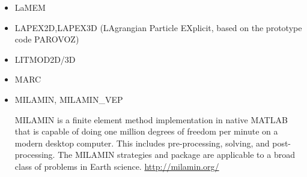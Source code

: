 \begin{itemize}
{\small
\noindent
\cite{facc14}
}

\item LaMEM 

{\small
\noindent
\cite{scbe08}
\cite{kamm10}
\cite{lemk11}
\cite{may12}
\cite{lesh14}\cite{cokm14}\cite{bakp14}\cite{feka14a}\cite{feka14b}
\cite{puka15}\cite{feka15}\cite{cofk15}
\cite{kapb16}\cite{coyc16}
\cite{pukp18}
\cite{eitp19}\cite{eitf20}
}

\item LAPEX2D,LAPEX3D  (LAgrangian Particle EXplicit, based on the prototype code PAROVOZ) 

{\small
\noindent
\cite{sopg05}\cite{baso05}\cite{soba05}
\cite{bbeg06}\cite{basv06}
\cite{peso06}\cite{peso08}
\cite{baso08}
\cite{scbe08}
\cite{sosk11}
}

\item LITMOD2D/3D

{\small 
\noindent
\cite{afrf07}
\cite{affr08}
\cite{fuac09}
\cite{fufa10}
\cite{jitf19}
}

\item MARC

{\small
\noindent
\cite{nesg97}
\cite{nesb99}
}


\item {\codefont MILAMIN, MILAMIN\_VEP} 

MILAMIN is a finite element method implementation in native MATLAB that is capable of doing one million degrees of freedom per minute on a modern desktop computer. This includes pre-processing, solving, and post-processing. The MILAMIN strategies and package are applicable to a broad class of problems in Earth science. \url{http://milamin.org/}


\end{itemize}
